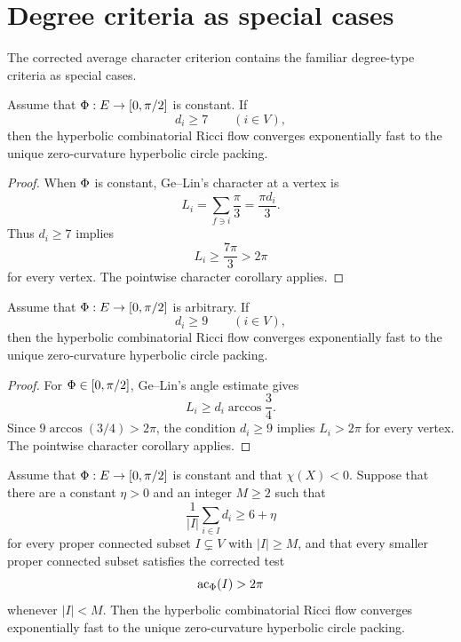 \section{Degree criteria as special cases}

The corrected average character criterion contains the familiar
degree-type criteria as special cases.

\begin{corollary}\label{cor:constant-weight-pointwise-degree}
\leanok
Assume that $\Phi:E\to[0,\pi/2]$ is constant.  If
\[
  d_i\ge7\qquad (i\in V),
\]
then the hyperbolic combinatorial Ricci flow converges exponentially fast
to the unique zero-curvature hyperbolic circle packing.
\end{corollary}

\begin{proof}
When $\Phi$ is constant, Ge--Lin's character at a vertex is
\[
  L_i=\sum_{f\ni i}\frac{\pi}{3}=\frac{\pi d_i}{3}.
\]
Thus $d_i\ge7$ implies
\[
  L_i\ge\frac{7\pi}{3}>2\pi
\]
for every vertex.  The pointwise character corollary applies.
\end{proof}

\begin{corollary}\label{cor:arbitrary-weight-pointwise-degree}
\leanok
Assume that $\Phi:E\to[0,\pi/2]$ is arbitrary.  If
\[
  d_i\ge9\qquad (i\in V),
\]
then the hyperbolic combinatorial Ricci flow converges exponentially fast
to the unique zero-curvature hyperbolic circle packing.
\end{corollary}

\begin{proof}
For $\Phi\in[0,\pi/2]$, Ge--Lin's angle estimate gives
\[
  L_i\ge d_i\arccos\frac34.
\]
Since $9\arccos(3/4)>2\pi$, the condition $d_i\ge9$ implies
$L_i>2\pi$ for every vertex.  The pointwise character corollary applies.
\end{proof}

\begin{corollary}\label{cor:large-set-lower-average-degree}
\leanok
Assume that $\Phi:E\to[0,\pi/2]$ is constant and that $\chi(X)<0$.
Suppose that there are a constant $\eta>0$ and an integer $M\ge2$ such that
\[
  \frac1{|I|}\sum_{i\in I}d_i \ge 6+\eta
\]
for every proper connected subset $I\subsetneq V$ with $|I|\ge M$, and
that every smaller proper connected subset satisfies the corrected test
\[
  \operatorname{ac}_\Phi(I)>2\pi
\]
whenever $|I|<M$.  Then the hyperbolic combinatorial Ricci flow converges
exponentially fast to the unique zero-curvature hyperbolic circle packing.
\end{corollary}

